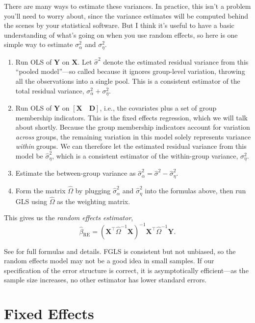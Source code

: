 \documentclass[
  12pt,
  oneside,openany]{book}
\begin{document}
There are many ways to estimate these variances.
In practice, this isn't a problem you'll need to worry about, since the variance estimates will be computed behind the scenes by your statistical software.
But I think it's useful to have a basic understanding of what's going on when you use random effects, so here is one simple way to estimate \(\sigma^2_\alpha\) and \(\sigma^2_\eta\).

\begin{enumerate}
\def\labelenumi{\arabic{enumi}.}
\item
  Run OLS of \(\mathbf{Y}\) on \(\mathbf{X}\).
  Let \(\hat{\sigma}^2\) denote the estimated residual variance from this ``pooled model''---so called because it ignores group-level variation, throwing all the observations into a single pool.
  This is a consistent estimator of the total residual variance, \(\sigma^2_\alpha + \sigma^2_\eta\).
\item
  Run OLS of \(\mathbf{Y}\) on \([\mathbf{X} \quad \mathbf{D}]\), i.e., the covariates plus a set of group membership indicators.
  This is the fixed effects regression, which we will talk about shortly.
  Because the group membership indicators account for variation \emph{across} groups, the remaining variation in this model solely represents variance \emph{within} groups.
  We can therefore let the estimated residual variance from this model be \(\hat{\sigma}^2_\eta\), which is a consistent estimator of the within-group variance, \(\sigma^2_\eta\).
\item
  Estimate the between-group variance as \(\hat{\sigma}^2_\alpha = \hat{\sigma}^2 - \hat{\sigma}^2_\eta\).
\item
  Form the matrix \(\hat{\Omega}\) by plugging \(\hat{\sigma}^2_\alpha\) and \(\hat{\sigma}^2_\eta\) into the formulas above, then run GLS using \(\hat{\Omega}\) as the weighting matrix.
\end{enumerate}

This gives us the \emph{random effects estimator},
\[
\hat{\beta}_{\text{RE}} = (\mathbf{X}^\top \hat{\Omega}^{-1} \mathbf{X})^{-1} \mathbf{X}^\top \hat{\Omega}^{-1} \mathbf{Y}.
\]

See \citet[392--395]{Johnston:1997um} for full formulas and details. FGLS is consistent but not unbiased, so the random effects model may not be a good idea in small samples. If our specification of the error structure is correct, it is asymptotically efficient---as the sample size increases, no other estimator has lower standard errors.

\hypertarget{fixed-effects}{%
\section{Fixed Effects}\label{fixed-effects}}
\end{document}
